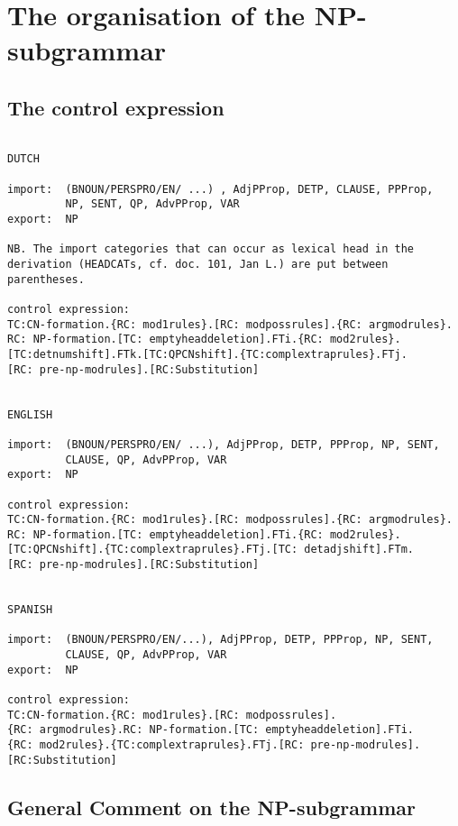 \section{The organisation of the NP-subgrammar}
\subsection{The control expression}
\begin{verbatim}

DUTCH

import:  (BNOUN/PERSPRO/EN/ ...) , AdjPProp, DETP, CLAUSE, PPProp, 
         NP, SENT, QP, AdvPProp, VAR
export:  NP

NB. The import categories that can occur as lexical head in the 
derivation (HEADCATs, cf. doc. 101, Jan L.) are put between 
parentheses.

control expression: 
TC:CN-formation.{RC: mod1rules}.[RC: modpossrules].{RC: argmodrules}.
RC: NP-formation.[TC: emptyheaddeletion].FTi.{RC: mod2rules}.
[TC:detnumshift].FTk.[TC:QPCNshift].{TC:complextraprules}.FTj.
[RC: pre-np-modrules].[RC:Substitution]


ENGLISH

import:  (BNOUN/PERSPRO/EN/ ...), AdjPProp, DETP, PPProp, NP, SENT, 
         CLAUSE, QP, AdvPProp, VAR
export:  NP

control expression:
TC:CN-formation.{RC: mod1rules}.[RC: modpossrules].{RC: argmodrules}.
RC: NP-formation.[TC: emptyheaddeletion].FTi.{RC: mod2rules}.
[TC:QPCNshift].{TC:complextraprules}.FTj.[TC: detadjshift].FTm.
[RC: pre-np-modrules].[RC:Substitution]


SPANISH

import:  (BNOUN/PERSPRO/EN/...), AdjPProp, DETP, PPProp, NP, SENT, 
         CLAUSE, QP, AdvPProp, VAR
export:  NP

control expression:
TC:CN-formation.{RC: mod1rules}.[RC: modpossrules].
{RC: argmodrules}.RC: NP-formation.[TC: emptyheaddeletion].FTi.
{RC: mod2rules}.{TC:complextraprules}.FTj.[RC: pre-np-modrules].
[RC:Substitution] 
\end{verbatim}

\subsection{General Comment on the NP-subgrammar}

